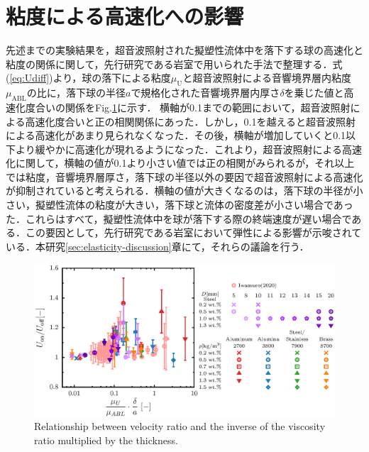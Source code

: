 \section{粘度による高速化への影響}
\label{sec:viscosity}

先述までの実験結果を，超音波照射された擬塑性流体中を落下する球の高速化と粘度の関係に関して，先行研究である岩室\cite{ref:8}で用いられた手法で整理する．式(\ref{eq:Udiff})より，球の落下による粘度$\mu_\text{U}$と超音波照射による音響境界層内粘度$\mu_\text{ABL}$の比に，落下球の半径$a$で規格化された音響境界層内厚さ$\delta$を乗じた値と高速化度合いの関係をFig.\ref{fig:viscosity_ratio}に示す．
横軸が0.1までの範囲において，超音波照射による高速化度合いと正の相関関係にあった．しかし，0.1を越えると超音波照射による高速化があまり見られなくなった．その後，横軸が増加していくと0.1以下より緩やかに高速化が現れるようになった．これより，超音波照射による高速化に関して，横軸の値が0.1より小さい値では正の相関がみられるが，それ以上では粘度，音響境界層厚さ，落下球の半径以外の要因で超音波照射による高速化が抑制されていると考えられる．横軸の値が大きくなるのは，落下球の半径が小さい，擬塑性流体の粘度が大きい，落下球と流体の密度差が小さい場合であった．これらはすべて，擬塑性流体中を球が落下する際の終端速度が遅い場合である．この要因として，先行研究である岩室\cite{ref:8}において弾性による影響が示唆されている．本研究\ref{sec:elasticity-discussion}章にて，それらの議論を行う．

\begin{figure}[ht]
    \centering
    \includegraphics[width=1.0\textwidth]{5-Results/viscosity.eps}
    \caption{Relationship between velocity ratio and the inverse of the viscosity ratio multiplied by the thickness.}
    \label{fig:viscosity_ratio}
\end{figure}

